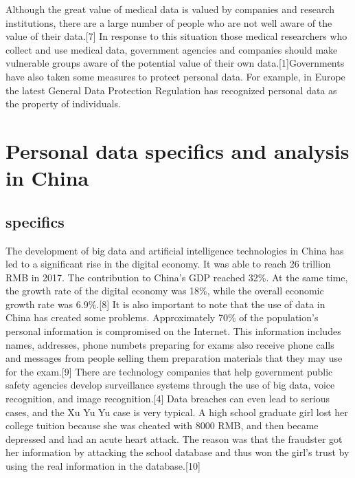 \documentclass[
]{article}
\begin{document}
Although the great value of medical data is valued by companies and
research institutions, there are a large number of people who are not
well aware of the value of their data.{[}7{]} In response to this
situation those medical researchers who collect and use medical data,
government agencies and companies should make vulnerable groups aware of
the potential value of their own data.{[}1{]}Governments have also taken
some measures to protect personal data. For example, in Europe the
latest General Data Protection Regulation has recognized personal data
as the property of individuals.

\hypertarget{personal-data-specifics-and-analysis-in-china}{%
\section{Personal data specifics and analysis in
China}\label{personal-data-specifics-and-analysis-in-china}}

\hypertarget{specifics}{%
\subsection{specifics}\label{specifics}}

The development of big data and artificial intelligence technologies in
China has led to a significant rise in the digital economy. It was able
to reach 26 trillion RMB in 2017. The contribution to China's GDP
reached 32\%. At the same time, the growth rate of the digital economy
was 18\%, while the overall economic growth rate was 6.9\%.{[}8{]} It is
also important to note that the use of data in China has created some
problems. Approximately 70\% of the population's personal information is
compromised on the Internet. This information includes names, addresses,
phone numbets preparing for exams also receive phone calls and messages
from people selling them preparation materials that they may use for the
exam.{[}9{]} There are technology companies that help government public
safety agencies develop surveillance systems through the use of big
data, voice recognition, and image recognition.{[}4{]} Data breaches can
even lead to serious cases, and the Xu Yu Yu case is very typical. A
high school graduate girl lost her college tuition because she was
cheated with 8000 RMB, and then became depressed and had an acute heart
attack. The reason was that the fraudster got her information by
attacking the school database and thus won the girl's trust by using the
real information in the database.{[}10{]}
\end{document}
